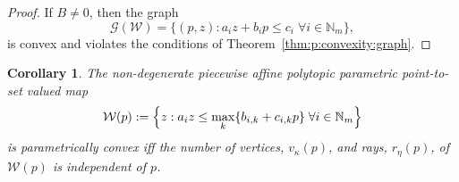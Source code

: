 \documentclass[journal]{IEEEtran}
\newcounter{thmcount}
\newtheorem{cor}[thmcount]{Corollary}
\theoremstyle{remark}
\theoremstyle{definition}
\begin{document}
%
\begin{proof}
If $B\neq 0$, then the graph
%
\begin{equation*}
	\mathscr G(\mathcal W) = \{(p,z):a_i z + b_i p\leq c_i \; \forall i\in\mathbb N_m\} ,
\end{equation*}
%
is convex and violates the conditions of Theorem~\ref{thm:p:convexity:graph}.
\end{proof}
%
\begin{cor}\label{thm:p:convexity:PWA:set:constant:num:verts}
The non-degenerate piecewise affine polytopic parametric point-to-set valued map 
%
\begin{equation}\label{eq:definition:PWA:polytopic:set:general}
  \mathcal W(p) := \Bigl\{z: a_i z \leq \max_{k}\{b_{i,k} + c_{i,k}p\} \; \forall i\in\mathbb N_m \Bigr\}
\end{equation}
%
is parametrically convex iff the number of vertices, $v_\kappa(p)$, and rays, $r_\eta(p)$, of $\mathcal W(p)$ is independent of $p$.
\end{cor}
%
\end{document}
